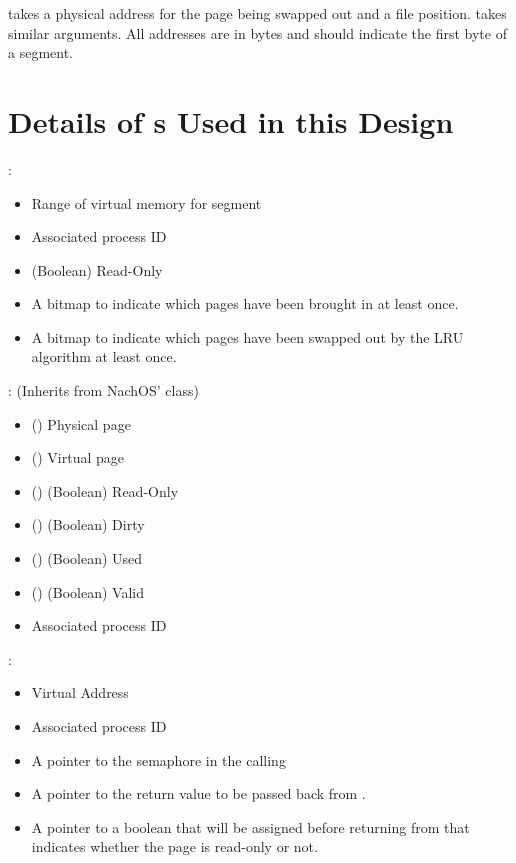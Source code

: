      takes a physical address for the page being
    swapped out and a file position.  takes similar
    arguments.  All addresses are in bytes and should indicate the first byte
    of a segment.

  \section{Details of s Used in this Design}
  \label{xref:structs}
    :
        \begin{itemize}
	\item Range of virtual memory for segment
	\item Associated process ID
	\item (Boolean) Read-Only
	\item A bitmap to indicate which pages have been brought in at least
	      once.
	\item A bitmap to indicate which pages have been swapped out by the LRU
	      algorithm at least once.
	\end{itemize}
    : (Inherits from NachOS'  class)
        \begin{itemize}
	\item () Physical page
	\item () Virtual page
	\item () (Boolean) Read-Only
	\item () (Boolean) Dirty
	\item () (Boolean) Used
	\item () (Boolean) Valid
	\item Associated process ID
	\end{itemize}
    :
        \begin{itemize}
	\item Virtual Address
	\item Associated process ID
	\item A pointer to the semaphore in the calling 
	\item A pointer to the return value to be passed back from 
	      .
	\item A pointer to a boolean that will be assigned before returning
	      from  that indicates whether the 
	      page is read-only or not.
	\end{itemize}
    
